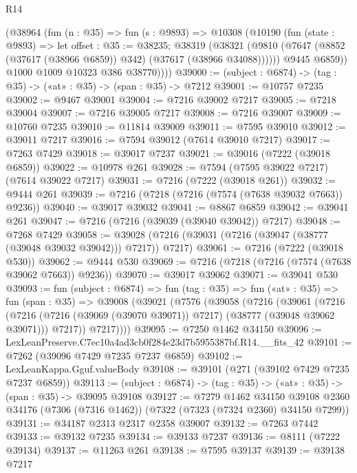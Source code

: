 \begin{lexlean}{R14}
\begin{coremodule}
          (@38964
            (fun (n : @35) =>
            fun (s : @9893) =>
            @10308
              (@10190
                (fun (state : @9893) =>
                let offset : @35 := @38235;
                @38319
                  (@38321
                    (@9810 (@7647 (@8852 (@37617 (@38966 @6859)) @342) (@37617 (@38966 @34088))))))
                @9445
                @6859))
            @1000
            @1009
            @10323
            @386
            @38770))))
@39000 := (subject : @6874) -> (tag : @35) -> («at» : @35) -> (span : @35) -> @7212
@39001 := @10757 @7235
@39002 := @9467 @39001
@39004 := @7216 @39002 @7217
@39005 := @7218 @39004
@39007 := @7216 @39005 @7217
@39008 := @7216 @39007
@39009 := @10760 @7235
@39010 := @11814 @39009
@39011 := @7595 @39010
@39012 := @39011 @7217
@39016 := @7594 @39012 (@7614 @39010 @7217)
@39017 := @7263 @7429
@39018 := @39017 @7237
@39021 := @39016 (@7222 (@39018 @6859))
@39022 := @10978 @261
@39028 := @7594 (@7595 @39022 @7217) (@7614 @39022 @7217)
@39031 := @7216 (@7222 (@39018 @261))
@39032 := @9444 @261
@39039 := @7216 (@7218 (@7216 (@7574 (@7638 @39032 @7663)) @9236))
@39040 := @39017 @39032
@39041 := @8867 @6859
@39042 := @39041 @261
@39047 := @7216 (@7216 (@39039 (@39040 @39042)) @7217)
@39048 := @7268 @7429
@39058 := @39028 (@7216 (@39031 (@7216 (@39047 (@38777 (@39048 @39032 @39042))) @7217)) @7217)
@39061 := @7216 (@7222 (@39018 @530))
@39062 := @9444 @530
@39069 := @7216 (@7218 (@7216 (@7574 (@7638 @39062 @7663)) @9236))
@39070 := @39017 @39062
@39071 := @39041 @530
@39093 := fun (subject : @6874) =>
  fun (tag : @35) =>
  fun («at» : @35) =>
  fun (span : @35) =>
  @39008
    (@39021
      (@7576
        (@39058
          (@7216
            (@39061
              (@7216
                (@7216 (@7216 (@39069 (@39070 @39071)) @7217) (@38777 (@39048 @39062 @39071)))
                @7217))
            @7217))))
@39095 := @7250 @1462 @34150
@39096 := LexLeanPreserve.C7ec10a4ad3cb0f284e23d7b5955387bf.R14.__fits_42
@39101 := @7262 (@39096 @7429 @7235 @7237 @6859)
@39102 := LexLeanKappa.Gguf.valueBody
@39108 := @39101 (@271 (@39102 @7429 @7235 @7237 @6859))
@39113 := (subject : @6874) -> (tag : @35) -> («at» : @35) -> (span : @35) -> @39095 @39108
@39127 := @7279
    @1462
    @34150
    @39108
    @2360
    @34176
    (@7306 (@7316 @1462))
    (@7322 (@7323 (@7324 @2360) @34150 @7299))
@39131 := @34187 @2313 @2317 @2358 @39007
@39132 := @7263 @7442
@39133 := @39132 @7235
@39134 := @39133 @7237
@39136 := @8111 (@7222 @39134)
@39137 := @11263 @261
@39138 := @7595 @39137
@39139 := @39138 @7217

\end{coremodule}
\end{lexlean}
